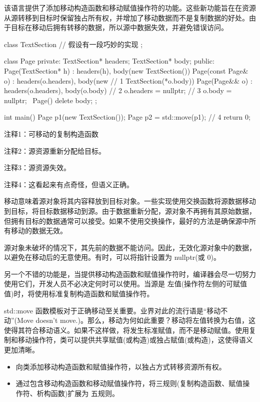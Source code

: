 该语言提供了添加移动构造函数和移动赋值操作符的功能。这些新功能旨在在资源从源转移到目标时保留独占所有权，并增加了移动数据而不是复制数据的好处。由于目标在移动后拥有转移的数据，所以源中数据失效，并避免错误访问。


\begin{cpp}
class TextSection {
  // 假设有一段巧妙的实现
};

class Page {
private:
  TextSection* headers;
  TextSection* body;
public:
  Page(TextSection* h) : headers(h), body(new TextSection()) {}
  Page(const Page& o) : headers(o.headers), body(new // 1
  TextSection(*o.body)) {}
  Page(Page&& o) : headers(o.headers), body(o.body) { // 2
    o.headers = nullptr; // 3
    o.body = nullptr;
  }
  ~Page() { delete body; }
};

int main() {
  Page p1(new TextSection());
  Page p2 = std::move(p1); // 4
  return 0;
}
\end{cpp}

{\footnotesize
注释1：可移动的复制构造函数

注释2：源资源重新分配给目标。

注释3：源资源失效。

注释4：这看起来有点奇怪，但语义正确。
}

移动意味着源对象将其内容释放到目标对象。一些实现使用交换函数将源数据移动到目标，将目标数据移动到源。由于数据重新分配，源对象不再拥有其原始数据，但拥有目标的数据通常可以接受。如果不使用交换操作，最好的方法是确保源中所有移动的数据无效。

源对象未破坏的情况下，其先前的数据不能访问。因此，无效化源对象中的数据，以避免在移动后的无意使用。有时，可以将指针设置为 nullptr(或 0)。

另一个不错的功能是，当提供移动构造函数和赋值操作符时，编译器会尽一切努力使用它们，开发人员不必决定何时可以使用。当源是 左值(操作符左侧的可赋值值)时，将使用标准复制构造函数和赋值操作符。

std::move 函数模板对于正确移动至关重要。业界对此的流行语是“移动不动”(Move doesn’t move.)。那么，移动为何如此重要？移动将左值转换为右值，这使得其符合移动语义。如果不这样做，将发生标准赋值，而不是移动赋值。使用复制和移动操作符，类可以提供共享赋值(或构造)或独占赋值(或构造)，这使得语义更加清晰。


\begin{itemize}
\item
向类添加移动构造函数和赋值操作符，以独占方式转移资源所有权。

\item
通过包含移动构造函数和移动赋值操作符，将三规则(复制构造函数、赋值操作符、析构函数)扩展为 五规则。
\end{itemize}
















